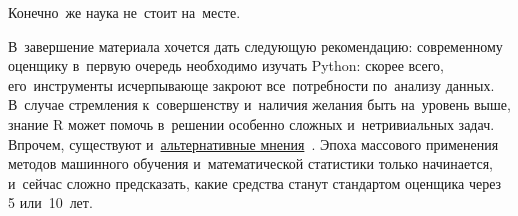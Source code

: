 \documentclass[]{scrreprt}
\begin{document}
Конечно~же наука не~стоит на~месте.

В~завершение материала хочется дать следующую рекомендацию: современному оценщику в~первую очередь необходимо изучать Python: скорее всего, его~инструменты исчерпывающе закроют все~потребности по~анализу данных. В~случае стремления к~совершенству и~наличия желания быть на~уровень выше, знание R может помочь в~решении особенно сложных и~нетривиальных задач. Впрочем, существуют и~\href{https://habr.com/ru/post/670250/}{альтернативные мнения}~\cite{Habr:Python-or-R}. Эпоха массового применения методов машинного обучения и~математической статистики только начинается, и~сейчас сложно предсказать, какие средства станут стандартом оценщика через 5 или~10~лет.

\clearpage

\printbibliography[title=Источники информации]
\end{document}
